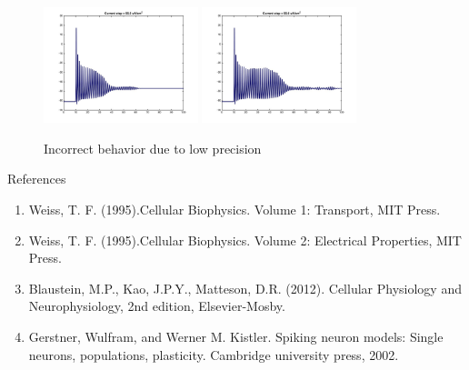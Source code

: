 \documentclass{beamer}
\begin{document}
\begin{frame}
  \begin{figure}
    \centering
    \includegraphics[width = 0.4\textwidth]{./images/current55p5.jpg}
    \includegraphics[width = 0.4\textwidth]{./images/current55p6.jpg}
    \caption{Incorrect behavior due to low precision}
  \end{figure}
\end{frame}

\begin{frame}{References}
\begin{enumerate}
\item Weiss, T. F. (1995).Cellular Biophysics. Volume 1: Transport, MIT Press.
\item Weiss, T. F. (1995).Cellular Biophysics. Volume 2: Electrical Properties, MIT Press.
\item Blaustein, M.P., Kao, J.P.Y., Matteson, D.R. (2012). Cellular Physiology and Neurophysiology, 2nd edition, Elsevier-Mosby. 
\item Gerstner, Wulfram, and Werner M. Kistler. Spiking neuron models: Single neurons, populations, plasticity. Cambridge university press, 2002.
\end{enumerate}
\end{frame}
\end{document}
